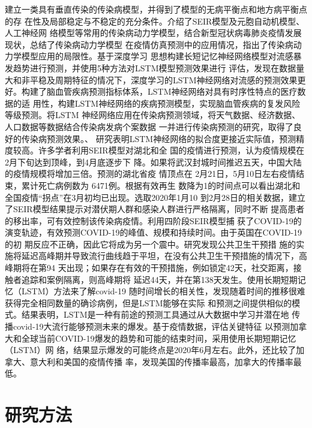 \documentclass[lang=cn,12pt,a4paper,cite=authoryear]{elegantpaper}
\begin{document}
\cite{cn1}建立一类具有垂直传染的传染病模型，并得到了模型的无病平衡点和地方病平衡点的存
在性及局部稳定与不稳定的充分条件。\cite{cn2}介绍了SEIR模型及元胞自动机模型、人工神经网
络模型等常用的传染病动力学模型，结合新型冠状病毒肺炎疫情发展现状，总结了传染病动力学模型
在疫情仿真预测中的应用情况，指出了传染病动力学模型应用的局限性。\cite{cn3}基于深度学习
思想构建长短记忆神经网络模型对流感暴发趋势进行预测，并使用5种方法对LSTM模型预测效果进行
评估，发现在数据量大和非平稳及周期特征的情况下，深度学习的LSTM神经网络对流感的预测效果更
好。\cite{cn4}构建了脑血管疾病预测指标体系，LSTM神经网络对具有时序性特点的医疗数据的适
用性，构建LSTM神经网络的疾病预测模型，实现脑血管疾病的复发风险等级预测。\cite{cn5}将LSTM
神经网络应用在传染病预测领域，将天气数据、经济数据、人口数据等数据结合传染病发病个案数据
一并进行传染病预测的研究，取得了良好的传染病预测效果。\cite{anuradha2020Prediction}、\cite{yan2020an}
研究表明LSTM神经网络的拟合度更接近实际值，预测精度较高。许多学者利用SEIR模型对湖北和全
国的疫情进行预测，\cite{yang2020modified}认为疫情规模在2月下旬达到顶峰，到4月底逐步下
降。如果将武汉封城时间推迟五天，中国大陆的疫情规模将增加三倍。\cite{cn6}预测的湖北省疫
情顶点在 2月21日，5月10日左右疫情结束，累计死亡病例数为 6471例。\cite{cn7}根据有效再生
数降为1的时间点可以看出湖北和全国疫情“拐点”在3月初均已出现。\cite{cn8}选取2020年1月10
到2月28日的相关数据，建立了SEIR模型结果提示对潜伏期人群和感染人群进行严格隔离，同时不断
提高患者的移出率，可有效控制该传染病疫情。\cite{liu2020modeling}利用四阶段SEIR模型捕
获了COVID-19的演变轨迹，有效预测COVID-19的峰值、规模和持续时间。由于英国在COVID-19的初
期反应不正确，因此它将成为另一个震中。\cite{marimuthu2020covid}研究发现公共卫生干预措
施的实施将延迟高峰期并导致流行曲线趋于平坦，在没有公共卫生干预措施的情况下，高峰期将在第94
天出现；如果存在有效的干预措施，例如锁定42天，社交距离，接触者追踪和案例隔离，则高峰期将
延迟44天，并在第138天发生。\cite{yudistira2020covid}使用长期短期记忆（LSTM）方法来了解covid-19
随时间增长的相关性，发现随着时间的推移很难获得完全相同数量的确诊病例，但是LSTM能够在实际
和预测之间提供相似的模式。结果表明，LSTM是一种有前途的预测工具通过从大数据中学习并潜在地
传播covid-19大流行能够预测未来的爆发。\cite{reddy2020time}基于疫情数据，评估关键特征
以预测加拿大和全球当前COVID-19爆发的趋势和可能的结束时间，采用使用长期短期记忆（LSTM）网
络，结果显示爆发的可能终点是2020年6月左右。此外，还比较了加拿大、意大利和美国的疫情传播
率，发现美国的传播率最高，加拿大的传播率最低。

\section{研究方法}
\end{document}
